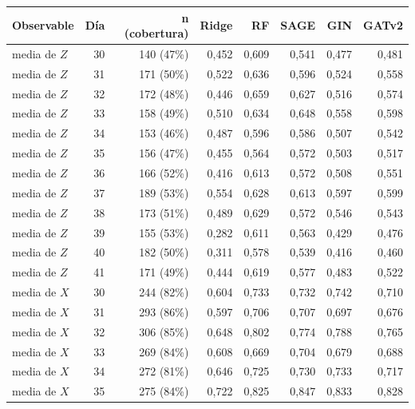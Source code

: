 \begin{table}[htbp]
    \centering
    {\footnotesize
    \begin{tabular}{@{}lrrrrrrr@{}}
        \toprule
        \textbf{Observable} & \textbf{Día} & \textbf{n (cobertura)} & \textbf{Ridge} & \textbf{RF} & \textbf{SAGE} & \textbf{GIN} & \textbf{GATv2} \\
        \midrule
        media de $Z$ & 30 & 140 (47\%) & 0,452 & 0,609 & 0,541 & 0,477 & 0,481 \\
        media de $Z$ & 31 & 171 (50\%) & 0,522 & 0,636 & 0,596 & 0,524 & 0,558 \\
        media de $Z$ & 32 & 172 (48\%) & 0,446 & 0,659 & 0,627 & 0,516 & 0,574 \\
        media de $Z$ & 33 & 158 (49\%) & 0,510 & 0,634 & 0,648 & 0,558 & 0,598 \\
        media de $Z$ & 34 & 153 (46\%) & 0,487 & 0,596 & 0,586 & 0,507 & 0,542 \\
        media de $Z$ & 35 & 156 (47\%) & 0,455 & 0,564 & 0,572 & 0,503 & 0,517 \\
        media de $Z$ & 36 & 166 (52\%) & 0,416 & 0,613 & 0,572 & 0,508 & 0,551 \\
        media de $Z$ & 37 & 189 (53\%) & 0,554 & 0,628 & 0,613 & 0,597 & 0,599 \\
        media de $Z$ & 38 & 173 (51\%) & 0,489 & 0,629 & 0,572 & 0,546 & 0,543 \\
        media de $Z$ & 39 & 155 (53\%) & 0,282 & 0,611 & 0,563 & 0,429 & 0,476 \\
        media de $Z$ & 40 & 182 (50\%) & 0,311 & 0,578 & 0,539 & 0,416 & 0,460 \\
        media de $Z$ & 41 & 171 (49\%) & 0,444 & 0,619 & 0,577 & 0,483 & 0,522 \\
        media de $X$ & 30 & 244 (82\%) & 0,604 & 0,733 & 0,732 & 0,742 & 0,710 \\
        media de $X$ & 31 & 293 (86\%) & 0,597 & 0,706 & 0,707 & 0,697 & 0,676 \\
        media de $X$ & 32 & 306 (85\%) & 0,648 & 0,802 & 0,774 & 0,788 & 0,765 \\
        media de $X$ & 33 & 269 (84\%) & 0,608 & 0,669 & 0,704 & 0,679 & 0,688 \\
        media de $X$ & 34 & 272 (81\%) & 0,646 & 0,725 & 0,730 & 0,733 & 0,717 \\
        media de $X$ & 35 & 275 (84\%) & 0,722 & 0,825 & 0,847 & 0,833 & 0,828 \\

\end{tabular}}
\end{table}
